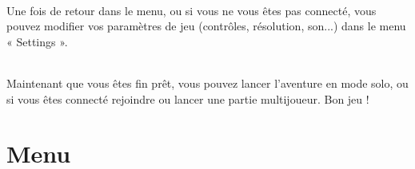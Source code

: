 \documentclass[titlepage, 13px, a4paper]{report}
\begin{document}
\paragraph*{} \hspace{0pt}
Une fois de retour dans le menu, ou si vous ne vous êtes pas connecté, vous pouvez modifier vos paramètres 
de jeu (contrôles, résolution, son...) dans le menu « Settings ». \\


\paragraph*{} \hspace{0pt}
Maintenant que vous êtes fin prêt, vous pouvez lancer l'aventure en mode solo, ou si vous êtes connecté rejoindre 
ou lancer une partie multijoueur. Bon jeu ! \\



\newpage


\part{Menu} 
\end{document}
